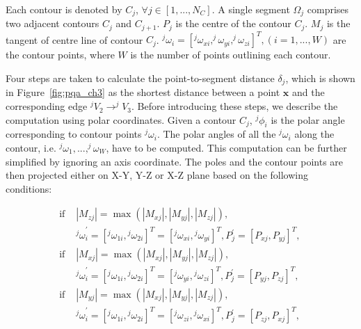 \begin{mydef}
Each contour is denoted by $C_j$, $\forall j \in [1,...,N_C]$.
A single segment $\Omega_j$ comprises two adjacent contours $C_j$ and $C_{j+1}$.
$P_j$ is the centre of the contour $C_j$.
$M_j$ is the tangent of centre line of contour $C_j$.
$^j\omega_i=[^j\omega_{xi},^j\omega_{yi},^j\omega_{zi}]^T, (i=1,...,W)$ are the contour points,
where $W$ is the number of points outlining each contour.
\end{mydef}

Four steps are taken to calculate the point-to-segment distance $\delta_j$, which is shown in Figure~\ref{fig:pqa_ch3} as the shortest distance between a point $\textbf{x}$ and the corresponding edge $^jV_2 \rightarrow ^jV_3$.
Before introducing these steps, we describe the computation using polar coordinates.
Given a contour $C_j$, $^j\phi_i$ is the polar angle corresponding to contour points $^j\omega_i$.
The polar angles of all the $^j\omega_i$ along the contour, i.e. $^j\omega_1, ..., ^j\omega_W$, have to be computed. 
This computation can be further simplified by ignoring an axis coordinate. 
The poles and the contour points are then projected either on X-Y, Y-Z or X-Z plane based on the following conditions:   

\begin{equation}
\begin{aligned}
\mbox{if } &|M_{zj}| = \max \left ( {|M_{xj}|,|M_{yj}|,|M_{zj}|} \right ) \mbox{, } \\
&{^j\omega}^{\prime}_i = [{^j\omega}_{1i},{^j\omega}_{2i}]^T = [{^j\omega}_{xi},{^j\omega}_{yi}]^T, P^{\prime}_j=[P_{xj},P_{yj}]^T \mbox{, } \\
\mbox{if } &|M_{xj}| = \max \left ( {|M_{xj}|,|M_{yj}|,|M_{zj}|} \right ) \mbox{, } \\
&{^j\omega}^{\prime}_i = [{^j\omega}_{1i},{^j\omega}_{2i}]^T = [{^j\omega}_{yi},{^j\omega}_{zi}]^T, P^{\prime}_j=[P_{yj},P_{zj}]^T \mbox{, } \\
\mbox{if } &|M_{yj}| = \max \left ( {|M_{xj}|,|M_{yj}|,|M_{zj}|} \right ) \mbox{, } \\
&{^j\omega}^{\prime}_i = [{^j\omega}_{1i},{^j\omega}_{2i}]^T = [{^j\omega}_{zi},{^j\omega}_{xi}]^T, P^{\prime}_j=[P_{zj},P_{xj}]^T \mbox{, } 
\end{aligned}
\label{eqt:preprocess1}
\end{equation}

